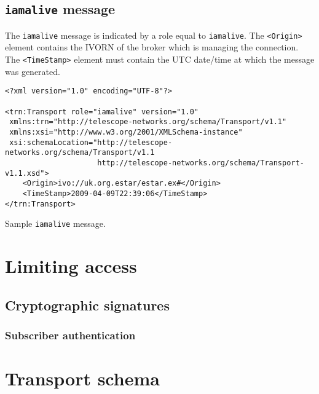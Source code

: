 \documentclass[a4paper,11pt]{ivoa}
\begin{document}
\subsection{\texttt{iamalive} message}

The \texttt{iamalive} message is indicated by a role equal to
\texttt{iamalive}. The \texttt{<Origin>} element contains the IVORN of the
broker which is managing the connection.  The \texttt{<TimeStamp>} element
must contain the UTC date/time at which the message was generated.

\begin{listing*}
\begin{verbatim}
<?xml version="1.0" encoding="UTF-8"?>

<trn:Transport role="iamalive" version="1.0"
 xmlns:trn="http://telescope-networks.org/schema/Transport/v1.1"
 xmlns:xsi="http://www.w3.org/2001/XMLSchema-instance"
 xsi:schemaLocation="http://telescope-networks.org/schema/Transport/v1.1
                     http://telescope-networks.org/schema/Transport-v1.1.xsd">
    <Origin>ivo://uk.org.estar/estar.ex#</Origin>
    <TimeStamp>2009-04-09T22:39:06</TimeStamp>
</trn:Transport>
\end{verbatim}
\caption{Sample \texttt{iamalive} message.}
\label{lst:testmessage}
\end{listing*}


\section{Limiting access}
\label{sec:limit}

\subsection{Cryptographic signatures}

\subsubsection{Subscriber authentication}
\label{sec:limit:crypto:subscriber}

\appendix

\section{Transport schema}
\label{sec:transportschema}



\end{document}
